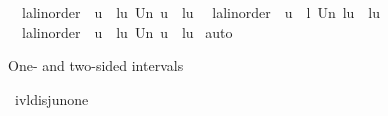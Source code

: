 \begin{isabellebody}
\ \ {\isachardoublequoteopen}{\isacharparenleft}{\kern0pt}l{\isacharcolon}{\kern0pt}{\isacharcolon}{\kern0pt}{\isacharprime}{\kern0pt}a{\isacharcolon}{\kern0pt}{\isacharcolon}{\kern0pt}linorder{\isacharparenright}{\kern0pt}\ {\isacharless}{\kern0pt}\ u\ {\isacharequal}{\kern0pt}{\isacharequal}{\kern0pt}{\isachargreater}{\kern0pt}\ {\isacharbraceleft}{\kern0pt}l{\isacharless}{\kern0pt}{\isachardot}{\kern0pt}{\isachardot}{\kern0pt}{\isacharless}{\kern0pt}u{\isacharbraceright}{\kern0pt}\ Un\ {\isacharbraceleft}{\kern0pt}u{\isacharbraceright}{\kern0pt}\ {\isacharequal}{\kern0pt}\ {\isacharbraceleft}{\kern0pt}l{\isacharless}{\kern0pt}{\isachardot}{\kern0pt}{\isachardot}{\kern0pt}u{\isacharbraceright}{\kern0pt}{\isachardoublequoteclose}\isanewline
\ \ {\isachardoublequoteopen}{\isacharparenleft}{\kern0pt}l{\isacharcolon}{\kern0pt}{\isacharcolon}{\kern0pt}{\isacharprime}{\kern0pt}a{\isacharcolon}{\kern0pt}{\isacharcolon}{\kern0pt}linorder{\isacharparenright}{\kern0pt}\ {\isasymle}\ u\ {\isacharequal}{\kern0pt}{\isacharequal}{\kern0pt}{\isachargreater}{\kern0pt}\ {\isacharbraceleft}{\kern0pt}l{\isacharbraceright}{\kern0pt}\ Un\ {\isacharbraceleft}{\kern0pt}l{\isacharless}{\kern0pt}{\isachardot}{\kern0pt}{\isachardot}{\kern0pt}u{\isacharbraceright}{\kern0pt}\ {\isacharequal}{\kern0pt}\ {\isacharbraceleft}{\kern0pt}l{\isachardot}{\kern0pt}{\isachardot}{\kern0pt}u{\isacharbraceright}{\kern0pt}{\isachardoublequoteclose}\isanewline
\ \ {\isachardoublequoteopen}{\isacharparenleft}{\kern0pt}l{\isacharcolon}{\kern0pt}{\isacharcolon}{\kern0pt}{\isacharprime}{\kern0pt}a{\isacharcolon}{\kern0pt}{\isacharcolon}{\kern0pt}linorder{\isacharparenright}{\kern0pt}\ {\isasymle}\ u\ {\isacharequal}{\kern0pt}{\isacharequal}{\kern0pt}{\isachargreater}{\kern0pt}\ {\isacharbraceleft}{\kern0pt}l{\isachardot}{\kern0pt}{\isachardot}{\kern0pt}{\isacharless}{\kern0pt}u{\isacharbraceright}{\kern0pt}\ Un\ {\isacharbraceleft}{\kern0pt}u{\isacharbraceright}{\kern0pt}\ {\isacharequal}{\kern0pt}\ {\isacharbraceleft}{\kern0pt}l{\isachardot}{\kern0pt}{\isachardot}{\kern0pt}u{\isacharbraceright}{\kern0pt}{\isachardoublequoteclose}\isanewline
%
\isadelimproof
%
\endisadelimproof
%
\isatagproof
{}\isamarkupfalse%
\ auto%
\endisatagproof
{\isafoldproof}%
%
\isadelimproof
%
\endisadelimproof
%
\begin{isamarkuptext}%
One- and two-sided intervals%
\end{isamarkuptext}\isamarkuptrue%
\isamarkupfalse%
\ ivl{\isacharunderscore}{\kern0pt}disj{\isacharunderscore}{\kern0pt}un{\isacharunderscore}{\kern0pt}one{\isacharcolon}{\kern0pt}\isanewline

\end{isabellebody}
